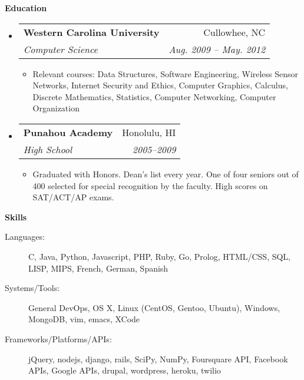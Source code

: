 \documentclass[letterpaper,11pt]{article}
\makeatletter
\newcommand{\resitem}[1]{\item #1 \vspace{-2pt}}
\newcommand{\resheading}[1]{{\large \colorbox{mygrey}{\begin{minipage}{\textwidth}{\textbf{#1 \vphantom{p\^{E}}}}\end{minipage}}}}
\newcommand{\ressubheading}[4]{
\begin{tabular*}{7.0in}{l@{\extracolsep{\fill}}r}
		\textbf{#1} & #2 \\
		\textit{#3} & \textit{#4} \\
\end{tabular*}\vspace{-6pt}}
\makeatother
\begin{document}
\resheading{Education}
\begin{itemize}
\item
   \ressubheading{Western Carolina University}{Cullowhee, NC}{Computer Science}{Aug. 2009 -- May. 2012}
   \begin{itemize}
      \resitem{Relevant courses: Data Structures, Software Engineering, Wireless Sensor Networks, Internet Security and Ethics, Computer Graphics, Calculus, Discrete Mathematics, Statistics, Computer Networking, Computer Organization}
   \end{itemize}
\item
   \ressubheading{Punahou Academy}{Honolulu, HI}{High School}{2005--2009}
   \begin{itemize}
      \resitem{Graduated with Honors. Dean's list every year. One of four seniors out of 400 selected for special recognition by the faculty. High scores on SAT/ACT/AP exams.}
   \end{itemize}
\end{itemize}
\pagebreak
\resheading{Skills}
\begin{description}
\item[Languages:]
C, Java, Python, Javascript, PHP, Ruby, Go, Prolog, HTML/CSS, SQL, LISP, MIPS, French, German, Spanish
\item[Systems/Tools:]
General DevOps, OS X, Linux (CentOS, Gentoo, Ubuntu), Windows, MongoDB, vim, emacs, XCode
\item[Frameworks/Platforms/APIs:]
jQuery, nodejs, django, rails, SciPy, NumPy, Foursquare API, Facebook APIs, Google APIs, drupal, wordpress, heroku, twilio
\end{description}
\end{document}
